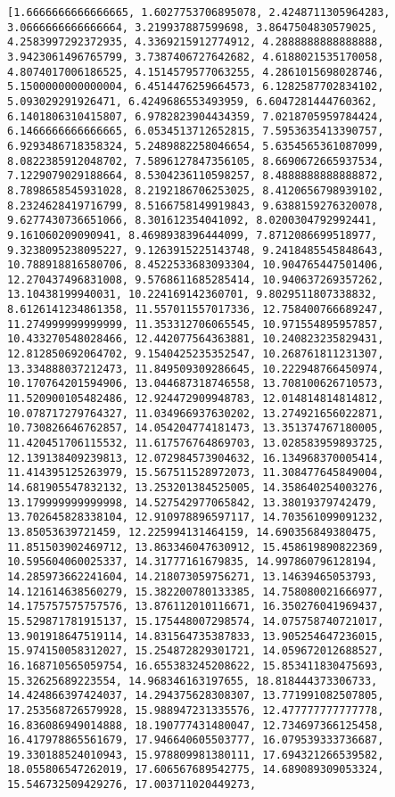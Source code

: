 \documentclass[11pt]{article}
\begin{document}
    \begin{Verbatim}[commandchars=\\\{\}]
[1.6666666666666665, 1.6027753706895078, 2.4248711305964283, 3.0666666666666664, 3.219937887599698, 3.8647504830579025, 4.2583997292372935, 4.3369215912774912, 4.2888888888888888, 3.9423061496765799, 3.7387406727642682, 4.6188021535170058, 4.8074017006186525, 4.1514579577063255, 4.2861015698028746, 5.1500000000000004, 6.4514476259664573, 6.1282587702834102, 5.093029291926471, 6.4249686553493959, 6.6047281444760362, 6.1401806310415807, 6.9782823904434359, 7.0218705959784424, 6.1466666666666665, 6.0534513712652815, 7.5953635413390757, 6.9293486718358324, 5.2489882258046654, 5.6354565361087099, 8.0822385912048702, 7.5896127847356105, 8.6690672665937534, 7.1229079029188664, 8.5304236110598257, 8.4888888888888872, 8.7898658545931028, 8.2192186706253025, 8.4120656798939102, 8.2324628419716799, 8.5166758149919843, 9.6388159276320078, 9.6277430736651066, 8.301612354041092, 8.0200304792992441, 9.161060209090941, 8.4698938396444099, 7.8712086699518977, 9.3238095238095227, 9.1263915225143748, 9.2418485545848643, 10.788918816580706, 8.4522533683093304, 10.904765447501406, 12.270437496831008, 9.5768611685285414, 10.940637269357262, 13.10438199940031, 10.224169142360701, 9.8029511807338832, 8.6126141234861358, 11.557011557017336, 12.758400766689247, 11.274999999999999, 11.353312706065545, 10.971554895957857, 10.433270548028466, 12.442077564363881, 10.240823235829431, 12.812850692064702, 9.1540425235352547, 10.268761811231307, 13.334888037212473, 11.849509309286645, 10.222948766450974, 10.170764201594906, 13.044687318746558, 13.708100626710573, 11.520900105482486, 12.924472909948783, 12.014814814814812, 10.078717279764327, 11.034966937630202, 13.274921656022871, 10.730826646762857, 14.054204774181473, 13.351374767180005, 11.420451706115532, 11.617576764869703, 13.028583959893725, 12.139138409239813, 12.072984573904632, 16.134968370005414, 11.414395125263979, 15.567511528972073, 11.308477645849004, 14.681905547832132, 13.253201384525005, 14.358640254003276, 13.179999999999998, 14.527542977065842, 13.38019379742479, 13.702645828338104, 12.910978896597117, 14.703561099091232, 13.85053639721459, 12.225994131464159, 14.690356849380475, 11.851503902469712, 13.863346047630912, 15.458619890822369, 10.595604060025337, 14.31777161679835, 14.997860796128194, 14.285973662241604, 14.218073059756271, 13.14639465053793, 14.121614638560279, 15.382200780133385, 14.758080021666977, 14.175757575757576, 13.876112010116671, 16.350276041969437, 15.529871781915137, 15.175448007298574, 14.075758740721017, 13.901918647519114, 14.831564735387833, 13.905254647236015, 15.974150058312027, 15.254872829301721, 14.059672012688527, 16.168710565059754, 16.655383245208622, 15.853411830475693, 15.32625689223554, 14.968346163197655, 18.818444373306733, 14.424866397424037, 14.294375628308307, 13.771991082507805, 17.253568726579928, 15.988947231335576, 12.477777777777778, 16.836086949014888, 18.190777431480047, 12.734697366125458, 16.417978865561679, 17.946640605503777, 16.079539333736687, 19.330188524010943, 15.978809981380111, 17.694321266539582, 18.055806547262019, 17.606567689542775, 14.689089309053324, 15.546732509429276, 17.003711020449273, 
\end{Verbatim}
\end{document}
